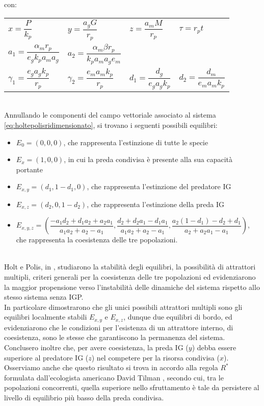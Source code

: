 \documentclass[12pt,oneside]{report}
\begin{document}
\vspace{1.5cm}
\noindent
con:\\

\noindent
 \begin{tabular}{llll}
$x=\dfrac{P}{k_p}$ & $y=\dfrac{a_gG}{r_p}$ & $z=\dfrac{a_mM}{r_p}$ & $\tau=r_pt$ \medskip \\
$a_1=\dfrac{\alpha_m r_p}{e_gk_pa_ma_g}$ & $a_2=\dfrac{\alpha_m \beta r_p}{k_pa_ma_ge_m}$ &  &  \medskip \\
$\gamma_1=\dfrac{e_ga_gk_p}{r_p}$ & $\gamma_2=\dfrac{e_ma_mk_p}{r_p}$ & $d_1=\dfrac{d_g}{e_ga_gk_p}$ & $d_2=\dfrac{d_m}{e_ma_mk_p}$
\end{tabular} \\

\newpage
\noindent
Annullando le componenti del campo vettoriale associato al sistema \eqref{eq:holtepolisridimensionato}, si trovano i seguenti possibili equilibri:\\

\begin{itemize}
    \item $E_0=(0,0,0)$, che rappresenta l'estinzione di tutte le specie
    \item $E_x=(1,0,0)$, in cui la preda condivisa è presente alla sua capacità portante
    \item $E_{x,y}=(d_1,1-d_1,0)$, che rappresenta l'estinzione del predatore IG
    \item $E_{x,z}=(d_2,0,1-d_2)$, che rappresenta l'estinzione della preda IG
    \item $E_{x,y,z}=\left(\dfrac{-a_1d_2+d_1a_2+a_2a_1}{a_1a_2+a_2-a_1},\dfrac{d_2+d_2a_1-d_1a_1}{a_1a_2+a_2-a_1},\dfrac{a_2(1-d_1)-d_2+d_1}{a_2+a_2a_1-a_1}\right)$,\\
che rappresenta la coesistenza delle tre popolazioni.
\end{itemize}\\

\vspace{0.7cm}
\noindent
Holt e Polis, in \cite{2}, studiarono la stabilità degli equilibri, la possibilità di attrattori multipli,  criteri generali per la coesistenza delle tre popolazioni ed evidenziarono la maggior propensione verso l'instabilità delle dinamiche del sistema rispetto allo stesso sistema senza IGP.\\
\noindent
In particolare dimostrarono che gli unici possibili attrattori multipli sono gli equilibri localmente stabili $E_{x,y}$ e $E_{x,z}$, dunque due equilibri di bordo, ed evidenziarono che le condizioni per l'esistenza di un attrattore interno, di coesistenza, sono le stesse che garantiscono la permanenza del sistema. \\
Conclusero inoltre che, per avere coesistenza, la preda IG ($y$) debba essere superiore al predatore IG ($z$)  nel competere per la risorsa condivisa ($x$).\\
Osserviamo anche che questo risultato si trova in accordo alla regola $R^*$ formulata dall'ecologista americano David Tilman \cite{7}, secondo cui, tra le popolazioni concorrenti, quella superiore nello sfruttamento è tale da persistere al livello di equilibrio più basso della preda condivisa. 
\end{document}
